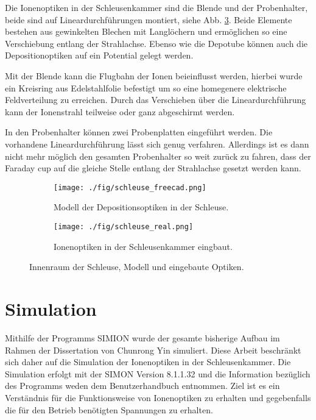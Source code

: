 Die Ionenoptiken in der Schleusenkammer sind die Blende und der Probenhalter, beide sind auf Lineardurchführungen montiert, siehe Abb. \ref{fig:schleuse_innen}.
Beide Elemente bestehen aus gewinkelten Blechen mit Langlöchern und ermöglichen so eine Verschiebung entlang der Strahlachse.
Ebenso wie die Depotube können auch die Depositionoptiken auf ein Potential gelegt werden.

Mit der Blende kann die Flugbahn der Ionen beieinflusst werden, hierbei wurde ein Kreisring aus Edelstahlfolie befestigt um so eine homegenere elektrische Feldverteilung zu erreichen.
Durch das Verschieben über die Lineardurchführung kann der Ionenstrahl teilweise oder ganz abgeschirmt werden.

In den Probenhalter können zwei Probenplatten eingeführt werden.
Die vorhandene Lineardurchführung lässt sich genug verfahren.
Allerdings ist es dann nicht mehr möglich den gesamten Probenhalter so weit zurück zu fahren, dass der Faraday cup auf die gleiche Stelle entlang der Strahlachse gesetzt werden kann.
\begin{figure}
    \begin{subfigure}[t]{0.478\textwidth}
      \texttt{[image: ./fig/schleuse\_freecad.png]}
      \caption{Modell der Depositionsoptiken in der Schleuse.}
      \label{fig:schleuse_freecad}
    \end{subfigure}\hfill
    \begin{subfigure}[t]{0.475\textwidth}
      \texttt{[image: ./fig/schleuse\_real.png]}
      \caption{Ionenoptiken in der Schleusenkammer eingbaut.}
      \label{fig:schleuse_real}
    \end{subfigure}
    \caption{Innenraum der Schleuse, Modell und eingebaute Optiken.}
    \label{fig:schleuse_innen}
\end{figure}


\section{Simulation}
Mithilfe der Programms SIMION \cite{Manura.2008} wurde der gesamte bisherige Aufbau im Rahmen der Dissertation von Chunrong Yin \cite{Yin.2007} simuliert.
Diese Arbeit beschränkt sich daher auf die Simulation der Ionenoptiken in der Schleusenkammer.
Die Simulation erfolgt mit der SIMON Version 8.1.1.32 und die Information bezüglich des Programms weden dem Benutzerhandbuch entnommen.
Ziel ist es ein Verständnis für die Funktionsweise von Ionenoptiken zu erhalten und gegebenfalls die für den Betrieb benötigten Spannungen zu erhalten.

